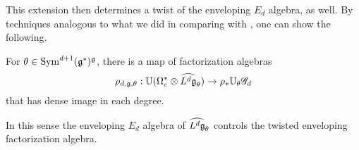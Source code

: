 This extension then determines a twist of the enveloping $E_d$ algebra, as well.
By techniques analogous to what we did in comparing with \cite{FHK},
one can show the following.

\begin{prop}
For $\theta \in {\rm Sym}^{d+1}(\mathfrak g^*)^\mathfrak g$,
there is a map of factorization algebras
\[
\rho_{d,\mathfrak g,\theta}: \mathbb U(\Omega^*_c \otimes \widehat{L^d \mathfrak g}_\theta) \to \rho_* \mathbb U_\theta \mathscr G_d
\]
that has dense image in each degree.
\end{prop}

In this sense the enveloping $E_d$ algebra of $\widehat{L^d \mathfrak g}_\theta$ controls the twisted enveloping factorization algebra.







